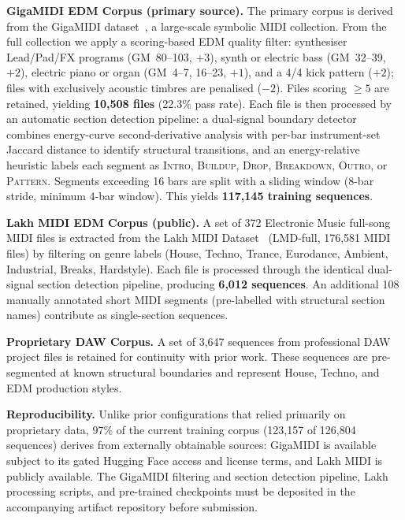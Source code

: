 \documentclass[pdflatex,sn-mathphys-num,twocolumn]{sn-jnl}
\theoremstyle{thmstyleone}
\theoremstyle{thmstyletwo}
\begin{document}
\noindent\textbf{GigaMIDI EDM Corpus (primary source).}
The primary corpus is derived from the GigaMIDI dataset~\cite{fradet2024gigamidi}, a large-scale
symbolic MIDI collection. From the full collection we apply a scoring-based
EDM quality filter: synthesiser Lead/Pad/FX programs (GM~80--103, $+3$),
synth or electric bass (GM~32--39, $+2$), electric piano or organ
(GM~4--7, 16--23, $+1$), and a 4/4 kick pattern ($+2$);
files with exclusively acoustic timbres are penalised ($-2$).
Files scoring $\geq\!5$ are retained, yielding \textbf{10,508 files}
(22.3\% pass rate).
Each file is then processed by an automatic section detection pipeline:
a dual-signal boundary detector combines energy-curve second-derivative
analysis with per-bar instrument-set Jaccard distance to identify structural
transitions, and an energy-relative heuristic labels each segment as
\textsc{Intro}, \textsc{Buildup}, \textsc{Drop}, \textsc{Breakdown},
\textsc{Outro}, or \textsc{Pattern}.
Segments exceeding 16 bars are split with a sliding window (8-bar stride,
minimum 4-bar window).
This yields \textbf{117,145 training sequences}.

\noindent\textbf{Lakh MIDI EDM Corpus (public).}
A set of 372 Electronic Music full-song MIDI files is extracted from the
Lakh MIDI Dataset~\cite{raffel2016lakh} (LMD-full, 176{,}581 MIDI files)
by filtering on genre labels (House, Techno, Trance, Eurodance, Ambient,
Industrial, Breaks, Hardstyle).
Each file is processed through the identical dual-signal section detection
pipeline, producing \textbf{6,012 sequences}.
An additional 108 manually annotated short MIDI segments
(pre-labelled with structural section names) contribute as single-section
sequences.

\noindent\textbf{Proprietary DAW Corpus.}
A set of 3,647 sequences from professional DAW project files is retained
for continuity with prior work.
These sequences are pre-segmented at known structural boundaries and
represent House, Techno, and EDM production styles.

\noindent\textbf{Reproducibility.}
Unlike prior configurations that relied primarily on proprietary data,
97\% of the current training corpus (123,157 of 126,804 sequences) derives
from externally obtainable sources: GigaMIDI is available subject to its gated
Hugging Face access and license terms, and Lakh MIDI is publicly available.
The GigaMIDI filtering and section detection pipeline, Lakh processing scripts,
and pre-trained checkpoints must be deposited in the accompanying artifact
repository before submission.
\end{document}
